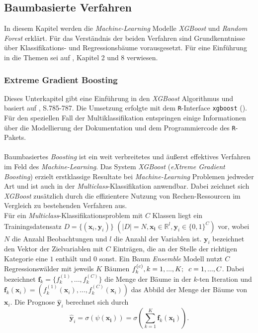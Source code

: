 \documentclass[a4paper,11pt]{article}
\begin{document}
\subsection{Baumbasierte Verfahren}\label{kap:machineLearning}

In diesem Kapitel werden die \textit{Machine-Learning} Modelle \textit{XGBoost} und \textit{Random Forest} erklärt. Für das Verständnis der beiden Verfahren sind Grundkenntnisse über Klassifikations- und Regressionsbäume vorausgesetzt. Für eine Einführung in die Themen sei auf \cite{CART}, Kapitel 2 und 8 verwiesen.



\subsubsection{Extreme Gradient Boosting}\label{kap:XG}

Dieses Unterkapitel gibt eine Einführung in den \textit{XGBoost} Algorithmus und basiert auf \cite{XGBoost}, S.785-787. Die Umsetzung erfolgte mit dem \texttt{R}-Interface \texttt{xgboost} (\cite{XGBoostR}). Für den speziellen Fall der Multiklassifikation entspringen einige Informationen über die Modellierung der Dokumentation und dem Programmiercode des \texttt{R}-Pakets.\\
\\
Baumbasiertes \textit{Boosting} ist ein weit verbreitetes und äußerst effektives Verfahren im Feld des \textit{Machine-Learning}. Das System \textit{XGBoost} (\textit{eXtreme Gradient Boosting}) erzielt erstklassige Resultate bei \textit{Machine-Learning} Problemen jedweder Art und ist auch in der \textit{Multiclass}-Klassifikation anwendbar. Dabei zeichnet sich \textit{XGBoost} zusätzlich durch die effizientere Nutzung von Rechen-Ressourcen im Vergleich zu bestehenden Verfahren aus. \\
Für ein \textit{Multiclass}-Klassifikationsproblem mit $C$ Klassen liegt ein Trainingsdatensatz $D = \{(\bm{x}_i, \bm{y}_i) \}$ $(|D| = N, \bm{x_i} \in \mathbb{R}^l, \bm{y}_i \in \{0,1\}^C)$ vor, wobei $N$ die Anzahl Beobachtungen und $l$ die Anzahl der Variablen ist. $\bm{y}_i$ bezeichnet den Vektor der Zielvariablen mit $C$ Einträgen, die an der Stelle der richtigen Kategorie eine $1$ enthält und $0$ sonst. Ein Baum \textit{Ensemble} Modell nutzt $C$ Regressionswälder mit jeweils $K$ Bäumen $f_k^{(c)}, k=1,...,K ;\hspace{0.2cm} c = 1,...,C$. Dabei bezeichnet $\bm{f}_k = \{f_k^{(1)},...,f_k^{(C)}\}$ die Menge der Bäume in der $k$-ten Iteration und $\bm{f}_k(\bm{x}_i) = (f_k^{(1)}(\bm{x}_i),...,f_k^{(C)}(\bm{x}_i))$ das Abbild der Menge der Bäume von $\bm{x}_i$. Die Prognose $\hat{\bm{y}}_i$ berechnet sich durch
\begin{equation}\label{eq:0}
    \hat{\bm{y}}_i = \sigma(\psi(\bm{x_i})) = \sigma( \sum_{k=1}^K \bm{f}_k(\bm{x_i})).
\end{equation}{}
\end{document}
